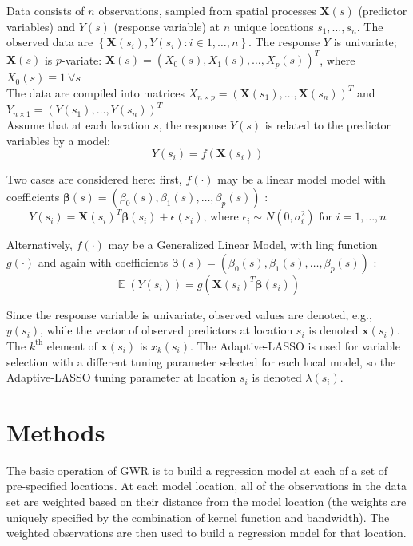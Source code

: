 \documentclass[authoryear ,review]{elsarticle}
\newcommand{\vect}[1]{\boldsymbol{#1}}
\newcommand{\E}{\mathop{\mathbb E}}
\begin{document}
	Data consists of $n$ observations, sampled from spatial processes $\vect{X}(s)$ (predictor variables) and $Y(s)$ (response variable) at $n$ unique locations $s_1, \dots, s_n$. The observed data are $\left\{ \vect{X}(s_i) , Y(s_i) : i \in 1, \dots, n \right\}$. The response $Y$ is univariate; $\vect{X}(s)$ is $p$-variate: $\vect{X}(s) = (X_0(s), X_1(s), \dots, X_p(s))^T$, where $X_0(s) \equiv 1 \: \forall s$ \\
	
	The data are compiled into matrices $X_{n \times p} = \left( \vect{X}(s_1), \dots, \vect{X}(s_n) \right)^T$ and $Y_{n \times 1} = \left(Y(s_1), \dots, Y(s_n) \right)^T$\\
		
	Assume that at each location $s$, the response $Y(s)$ is related to the predictor variables by a model:\\
	
	\[
		Y(s_i) = f \left(\vect{X}(s_i) \right) %
	\]
	
	Two cases are considered here: first, $f(\cdot)$ may be a linear model model with coefficients $\vect{\beta}(s) = (\beta_0(s), \beta_1(s), \dots, \beta_p(s))$ :\\
	\[
		Y(s_i) = \vect{X}(s_i)^T \vect{\beta}(s_i) + \epsilon(s_i) \text{, where } \epsilon_i \sim N\left( 0, \sigma_i^2 \right) \text{ for } i=1, \dots, n
	\]
	
	Alternatively, $f(\cdot)$ may be a Generalized Linear Model, with ling function $g(\cdot)$ and again with coefficients $\vect{\beta}(s) = (\beta_0(s), \beta_1(s), \dots, \beta_p(s))$ :\\
	\[
		\E \left( Y(s_i) \right) = g(\vect{X}(s_i)^T \vect{\beta}(s_i))
	\]
	
	Since the response variable is univariate, observed values are denoted, e.g., $y(s_i)$, while the vector of observed predictors at location $s_i$ is denoted $\vect{x}(s_i)$. The $k^{\text{th}}$ element of $\vect{x}(s_i)$ is $x_k(s_i)$. The Adaptive-LASSO is used for variable selection with a different tuning parameter selected for each local model, so the Adaptive-LASSO tuning parameter at location $s_i$ is denoted $\lambda(s_i)$.\\ 
	

\section{Methods}
	The basic operation of GWR is to build a regression model at each of a set of pre-specified locations. At each model location, all of the observations in the data set are weighted based on their distance from the model location (the weights are uniquely specified by the combination of kernel function and bandwidth). The weighted observations are then used to build a regression model for that location.\\
	
\end{document}
